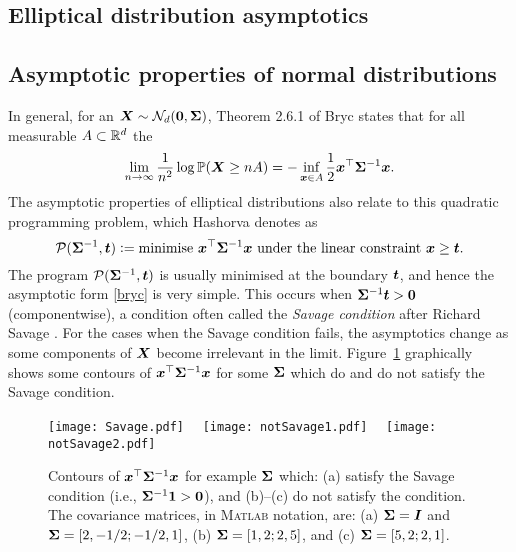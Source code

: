\begin{subappendices}
\section{Elliptical distribution asymptotics} \label{scn:elliptical_asymptotics}

\subsection{Asymptotic properties of normal distributions}

In general, for an $\bm{X} \sim \mathcal{N}_d(\bm{0},\bm{\Sigma})$, Theorem 2.6.1 of Bryc \cite{bryc2012normal} states that for all measurable $A \subset \mathbb{R}^d$ the
\begin{equation} \label{bryc}
\lim_{n \to \infty} \frac1{n^2} \log \operatorname{{\mathbb P}}(\bm{X} \ge nA) = - \inf_{\bm{x} \in A} \frac12 \bm{x}^\top \bm{\Sigma}^{-1} \bm{x}.
\end{equation}
The asymptotic properties of elliptical distributions also relate to this quadratic programming problem, which Hashorva \cite{hashorva2005asymptotics,hashorva2007asymptotic} denotes as
\begin{equation} \label{quad_prog}
\mathcal{P}(\bm{\Sigma}^{-1}, \bm{t}) := \text{minimise } \bm{x}^\top \bm{\Sigma}^{-1} \bm{x} \text{ under the linear constraint } \bm{x} \ge \bm{t}.
\end{equation}
The program $\mathcal{P}(\bm{\Sigma}^{-1}, \bm{t})$ is usually minimised at the boundary $\bm{t}$, and hence the asymptotic form \eqref{bryc} is very simple. This occurs when
$\bm{\Sigma}^{-1} \bm{t} > \bm{0}$ (componentwise), a condition often called the \emph{Savage condition} after Richard Savage \cite{savage1962mills}. For the cases when the Savage condition fails, the asymptotics change as some components of $\bm{X}$ become irrelevant in the limit. Figure~\ref{fig:savage_condition} graphically shows some contours of $\bm{x}^\top \bm{\Sigma}^{-1} \bm{x}$ for some $\bm{\Sigma}$ which do and do not satisfy the Savage condition.

\begin{figure}[H]
\centering
\texttt{[image: Savage.pdf]}~~
\texttt{[image: notSavage1.pdf]}~~
\texttt{[image: notSavage2.pdf]}
\caption{Contours of $\bm{x}^\top \bm{\Sigma}^{-1} \bm{x}$ for example $\bm{\Sigma}$ which: (a) satisfy the Savage condition (i.e., $\bm{\Sigma}^{-1} \bm{1} > \bm{0}$), and (b)--(c) do not satisfy the condition. The covariance matrices, in \textsc{Matlab} notation, are: (a) $\bm{\Sigma} = \bm{I}$ and  $\bm{\Sigma} =[2, -1/2; -1/2, 1]$, (b) $\bm{\Sigma} = [1, 2; 2, 5]$, and (c) $\bm{\Sigma} = [5, 2; 2, 1]$.}
\label{fig:savage_condition}
\end{figure}


\end{subappendices}

